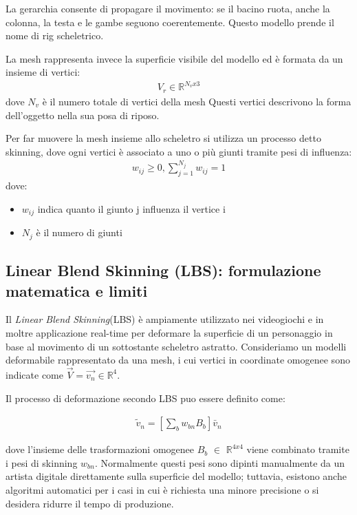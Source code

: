 \begin{itemize}
La gerarchia consente di propagare il movimento: se il bacino ruota, anche la colonna, la testa e le gambe seguono coerentemente. Questo modello prende il nome di rig scheletrico.

La mesh rappresenta invece la superficie visibile del modello ed è formata da un insieme di vertici: 
\begin{align*}
    V_r \in \mathbb{R}^{{N_v}x3}
\end{align*}
dove \(N_v\) è il numero totale di vertici della mesh
Questi vertici descrivono la forma dell'oggetto nella sua posa di riposo.

Per far muovere la mesh insieme allo scheletro si utilizza un processo detto skinning, dove ogni vertici è associato a uno o più giunti tramite pesi di influenza:
\begin{align*}
    {w_{ij}} \geq 0   ,    \sum_{j=1}^{N_j} {w_{ij}} = 1
\end{align*}
dove:
\begin{itemize}
    \item \({w_{ij}}\) indica quanto il giunto j influenza il vertice i
    \item  \(N_j\) è il numero di giunti
\end{itemize}

\subsection{Linear Blend Skinning (LBS): formulazione matematica e limiti}

Il \textit{Linear Blend Skinning}(LBS) è ampiamente utilizzato nei videogiochi e in moltre applicazione real-time per deformare la superficie di un personaggio in base al movimento di un sottostante scheletro astratto.
Consideriamo un modelli deformabile rappresentato da una mesh, i cui vertici in coordinate omogenee sono indicate come $\vec{V} = \vec{v_n} \in \mathbb{R}^{4}$.

Il processo di deformazione secondo LBS puo essere definito come: 

\begin{align*}
    \tilde{v}_n = [\sum_b {w_{bn}}{B_b}]\bar{v}_n
\end{align*}

dove l'insieme delle trasformazioni omogenee \(B_b\) $\in$ $\mathbb{R}^{4x4}$ viene combinato tramite i pesi di skinning \(w_{bn}\).
Normalmente questi pesi sono dipinti manualmente da un artista digitale direttamente sulla superficie del modello; tuttavia, esistono anche algoritmi automatici per i casi in cui è richiesta una minore precisione o si desidera ridurre il tempo di produzione.


\end{itemize}
